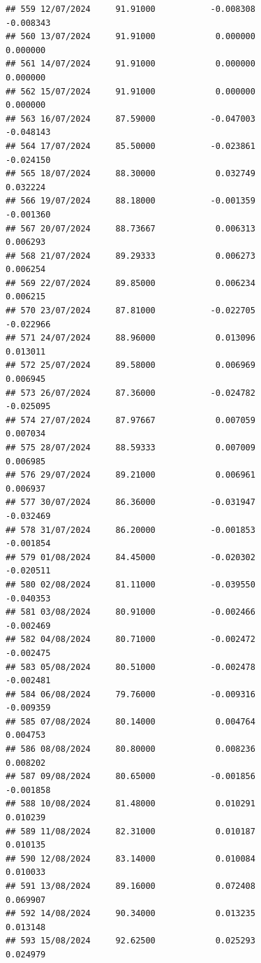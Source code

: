 \documentclass[
]{article}
\begin{document}
\begin{verbatim}
## 559 12/07/2024     91.91000           -0.008308               -0.008343
## 560 13/07/2024     91.91000            0.000000                0.000000
## 561 14/07/2024     91.91000            0.000000                0.000000
## 562 15/07/2024     91.91000            0.000000                0.000000
## 563 16/07/2024     87.59000           -0.047003               -0.048143
## 564 17/07/2024     85.50000           -0.023861               -0.024150
## 565 18/07/2024     88.30000            0.032749                0.032224
## 566 19/07/2024     88.18000           -0.001359               -0.001360
## 567 20/07/2024     88.73667            0.006313                0.006293
## 568 21/07/2024     89.29333            0.006273                0.006254
## 569 22/07/2024     89.85000            0.006234                0.006215
## 570 23/07/2024     87.81000           -0.022705               -0.022966
## 571 24/07/2024     88.96000            0.013096                0.013011
## 572 25/07/2024     89.58000            0.006969                0.006945
## 573 26/07/2024     87.36000           -0.024782               -0.025095
## 574 27/07/2024     87.97667            0.007059                0.007034
## 575 28/07/2024     88.59333            0.007009                0.006985
## 576 29/07/2024     89.21000            0.006961                0.006937
## 577 30/07/2024     86.36000           -0.031947               -0.032469
## 578 31/07/2024     86.20000           -0.001853               -0.001854
## 579 01/08/2024     84.45000           -0.020302               -0.020511
## 580 02/08/2024     81.11000           -0.039550               -0.040353
## 581 03/08/2024     80.91000           -0.002466               -0.002469
## 582 04/08/2024     80.71000           -0.002472               -0.002475
## 583 05/08/2024     80.51000           -0.002478               -0.002481
## 584 06/08/2024     79.76000           -0.009316               -0.009359
## 585 07/08/2024     80.14000            0.004764                0.004753
## 586 08/08/2024     80.80000            0.008236                0.008202
## 587 09/08/2024     80.65000           -0.001856               -0.001858
## 588 10/08/2024     81.48000            0.010291                0.010239
## 589 11/08/2024     82.31000            0.010187                0.010135
## 590 12/08/2024     83.14000            0.010084                0.010033
## 591 13/08/2024     89.16000            0.072408                0.069907
## 592 14/08/2024     90.34000            0.013235                0.013148
## 593 15/08/2024     92.62500            0.025293                0.024979

\end{verbatim}
\end{document}
